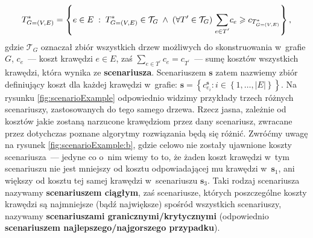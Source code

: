 \begin{equation}
	T^{\ast}_{G = \left( V, E \right)} = \left\{ e \in E \; : \; T^{\ast}_{G = \left( V, E \right)} \in \mathcal{T}_{G} \; \wedge \; \left( \forall T^{\prime} \in \mathcal{T}_{G} \right) \; \sum_{ \mathclap{e \in T^{\prime} }} c_{e} \geqslant c_{ T^{\ast}_{ G = \left( V, E \right) } } \right\}\text{,}
\end{equation}
gdzie $\mathcal{T}_{G}$ oznaczał zbiór wszystkich drzew możliwych do skonstruowania w~grafie $G$, $c_{e}$~--- koszt krawędzi $e \in E$, zaś $\sum_{ e \in T^{\prime} } c_{e} = c_{T^{\prime}}$~--- sumę kosztów wszystkich krawędzi, która wynika ze \textbf{scenariusza}.
Scenariuszem $\textbf{s}$ zatem nazwiemy zbiór definiujący koszt dla każdej krawędzi w~grafie: $\textbf{s} = \left\{ c^{\textbf{s}}_{e_{i}} : i \in \left\{ 1, \dots, \left| E \right| \right\} \right\}$.
Na rysunku \ref{fig:scenarioExample} odpowiednio widzimy przykłady trzech różnych scenariuszy, zastosowanych do tego samego drzewa.
Rzecz jasna, zależnie od kosztów jakie zostaną narzucone krawędziom przez dany scenariusz, zwracane przez dotychczas poznane algorytmy rozwiązania będą się różnić.
Zwróćmy uwagę na rysunek \ref{fig:scenarioExample:b}, gdzie celowo nie zostały ujawnione koszty scenariusza~--- jedyne co o~nim wiemy to to, że żaden koszt krawędzi w~tym scenariuszu nie jest mniejszy od kosztu odpowiadającej mu krawędzi w~$\textbf{s}_{1}$, ani większy od kosztu tej samej krawędzi w~scenariuszu $\textbf{s}_{3}$.
Taki rodzaj scenariusza nazywamy \textbf{scenariuszem ciągłym}, zaś scenariusze, których poszczególne koszty krawędzi są najmniejsze (bądź największe) spośród wszystkich scenariuszy, nazywamy \textbf{scenariuszami granicznymi/krytycznymi} (odpowiednio \textbf{scenariuszem najlepszego/najgorszego przypadku}).

